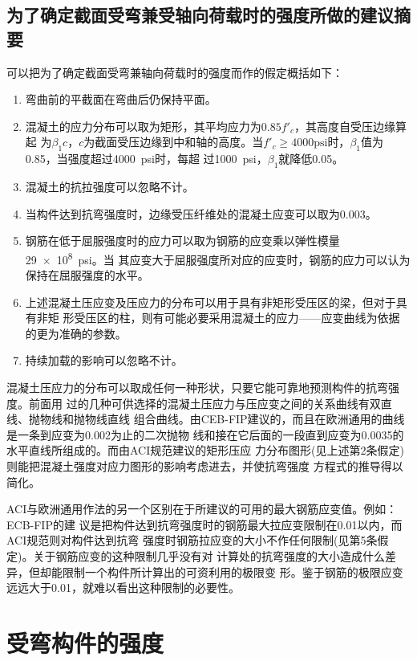 \documentclass[12pt,a4paper]{book}
\begin{document}
\section{为了确定截面受弯兼受轴向荷载时的强度所做的建议摘要}

可以把为了确定截面受弯兼轴向荷载时的强度而作的假定概括如下：
\begin{enumerate}
\item 弯曲前的平截面在弯曲后仍保持平面。
\item 混凝土的应力分布可以取为矩形，其平均应力为$0.85f'_c$，其高度自受压边缘算起
  为$\beta_1c$，$c$为截面受压边缘到中和轴的高度。当$f'_c \ge
  4000\mathrm{psi}$时，$\beta_1$值为0.85，当强度超过\SI{4000}{psi}时，每超
  过\SI{1000}{psi}，$\beta_1$就降低0.05。
\item 混凝土的抗拉强度可以忽略不计。
\item 当构件达到抗弯强度时，边缘受压纤维处的混凝土应变可以取为0.003。
\item 钢筋在低于屈服强度时的应力可以取为钢筋的应变乘以弹性模量\SI{29e8}{psi}。当
  其应变大于屈服强度所对应的应变时，钢筋的应力可以认为保持在屈服强度的水平。
\item 上述混凝土压应变及压应力的分布可以用于具有非矩形受压区的梁，但对于具有非矩
  形受压区的柱，则有可能必要采用混凝土的应力——应变曲线为依据的更为准确的参数。
\item 持续加载的影响可以忽略不计。
\end{enumerate}
混凝土压应力的分布可以取成任何一种形状，只要它能可靠地预测构件的抗弯强度。前面用
过的几种可供选择的混凝土压应力与压应变之间的关系曲线有双直线、抛物线和抛物线直线
组合曲线。由CEB-FIP建议的，而且在欧洲通用的曲线是一条到应变为0.002为止的二次抛物
线和接在它后面的一段直到应变为0.0035的水平直线所组成的。而由ACI规范建议的矩形压应
力分布图形(见上述第2条假定)则能把混凝土强度对应力图形的影响考虑进去，并使抗弯强度
方程式的推导得以简化。

ACI与欧洲通用作法的另一个区别在于所建议的可用的最大钢筋应变值。例如：ECB-FIP的建
议是把构件达到抗弯强度时的钢筋最大拉应变限制在0.01以内，而ACI规范则对构件达到抗弯
强度时钢筋拉应变的大小不作任何限制(见第5条假定)。关于钢筋应变的这种限制几乎没有对
计算处的抗弯强度的大小造成什么差异，但却能限制一个构件所计算出的可资利用的极限变
形。鉴于钢筋的极限应变远远大于0.01，就难以看出这种限制的必要性。

\chapter{受弯构件的强度}
\end{document}
